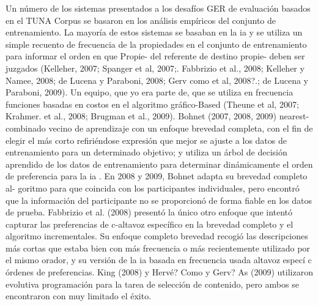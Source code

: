 

Un n\'umero de los sistemas presentados a los desaf\'ios GER de evaluaci\'on basados
en el TUNA Corpus se basaron en los an\'alisis emp\'iricos del conjunto de entrenamiento. La mayor\'ia
de estos sistemas se basaban en la
ia y se utiliza un simple recuento de frecuencia de la
propiedades en el conjunto de entrenamiento para informar el orden en que Propie- del referente de destino
propie- deben ser juzgados (Kelleher, 2007; Spanger et al, 2007;. Fabbrizio et al., 2008;
Kelleher y Namee, 2008; de Lucena y Paraboni, 2008; Gerv como et al, 2008?.;
de Lucena y Paraboni, 2009). Un equipo, que yo era parte de, que se utiliza en frecuencia
funciones basadas en costos en el algoritmo gr\'afico-Based (Theune et al, 2007; Krahmer.
et al., 2008; Brugman et al., 2009). Bohnet (2007, 2008, 2009) nearest- combinado
vecino de aprendizaje con un enfoque brevedad completa, con el fin de elegir el m\'as corto
refiri\'endose expresi\'on que mejor se ajuste a los datos de entrenamiento para un determinado objetivo; y
utiliza un \'arbol de decisi\'on aprendido de los datos de entrenamiento para determinar din\'amicamente el
orden de preferencia para la
ia
. En 2008 y 2009, Bohnet adapta su brevedad completo al-
goritmo para que coincida con los participantes individuales, pero encontr\'o que la informaci\'on del participante
no se proporcion\'o de forma fiable en los datos de prueba. Fabbrizio et al. (2008) present\'o la
\'unico otro enfoque que intent\'o capturar las preferencias de c-altavoz espec\'ifico en
la brevedad completo y el algoritmo incrementales. Su enfoque completo brevedad recogi\'o
las descripciones m\'as cortas que estaba bien con m\'as frecuencia o m\'as recientemente utilizado por el
mismo orador, y su versi\'on de la
ia
basada en frecuencia usada altavoz espec\'i c
\'ordenes de preferencias. King (2008) y Herv\'e? Como y Gerv? As (2009) utilizaron evolutiva
programaci\'on para la tarea de selecci\'on de contenido, pero ambos se encontraron con muy limitado
el \'exito.

